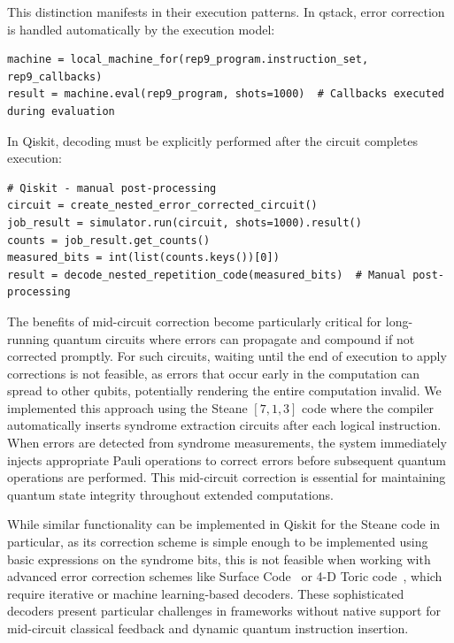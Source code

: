 This distinction manifests in their execution patterns. In qstack, error correction is handled automatically by the execution model:

\begin{verbatim}
machine = local_machine_for(rep9_program.instruction_set, rep9_callbacks)
result = machine.eval(rep9_program, shots=1000)  # Callbacks executed during evaluation
\end{verbatim}

In Qiskit, decoding must be explicitly performed after the circuit completes execution:

\begin{verbatim}
# Qiskit - manual post-processing
circuit = create_nested_error_corrected_circuit()
job_result = simulator.run(circuit, shots=1000).result()
counts = job_result.get_counts()
measured_bits = int(list(counts.keys())[0])
result = decode_nested_repetition_code(measured_bits)  # Manual post-processing
\end{verbatim}

The benefits of mid-circuit correction become particularly critical for long-running quantum circuits where errors can propagate and compound if not corrected promptly. For such circuits, waiting until the end of execution to apply corrections is not feasible, as errors that occur early in the computation can spread to other qubits, potentially rendering the entire computation invalid. We implemented this approach using the Steane $[7,1,3]$ code where the compiler automatically inserts syndrome extraction circuits after each logical instruction. When errors are detected from syndrome measurements, the system immediately injects appropriate Pauli operations to correct errors before subsequent quantum operations are performed. This mid-circuit correction is essential for maintaining quantum state integrity throughout extended computations.

While similar functionality can be implemented in Qiskit for the Steane code in particular, as its correction scheme is simple enough to be implemented using basic expressions on the syndrome bits, this is not feasible when working with advanced error correction schemes like Surface Code~\cite{fowler2012surfacecode} or 4-D Toric code~\cite{aasen2025topologically}, which require iterative or machine learning-based decoders. These sophisticated decoders present particular challenges in frameworks without native support for mid-circuit classical feedback and dynamic quantum instruction insertion.


